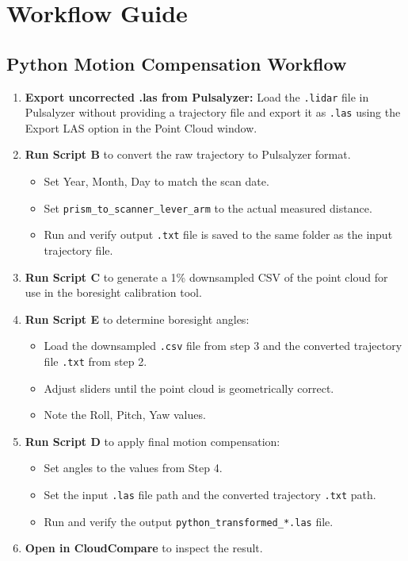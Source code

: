 \chapter{Workflow Guide}

\section{Python Motion Compensation Workflow}
\begin{enumerate}
    \item \textbf{Export uncorrected .las from Pulsalyzer:} Load the \texttt{.lidar} file in Pulsalyzer without providing a trajectory file and export it as \texttt{.las} using the Export LAS option in the Point Cloud window.
    \item \textbf{Run Script B} to convert the raw trajectory to Pulsalyzer format.
          \begin{itemize}
              \item Set Year, Month, Day to match the scan date.
              \item Set \texttt{prism\_to\_scanner\_lever\_arm} to the actual measured distance.
              \item Run and verify output \texttt{.txt} file is saved to the same folder as the input trajectory file.
          \end{itemize}
    \item \textbf{Run Script C} to generate a 1\% downsampled CSV of the point cloud for use in the boresight calibration tool.
    \item \textbf{Run Script E} to determine boresight angles:
          \begin{itemize}
              \item Load the downsampled \texttt{.csv} file from step 3 and the converted trajectory file \texttt{.txt} from step 2.
              \item Adjust sliders until the point cloud is geometrically correct.
              \item Note the Roll, Pitch, Yaw values.
          \end{itemize}
    \item \textbf{Run Script D} to apply final motion compensation:
          \begin{itemize}
              \item Set angles to the values from Step 4.
              \item Set the input \texttt{.las} file path and the converted trajectory \texttt{.txt} path.
              \item Run and verify the output \texttt{python\_transformed\_*.las} file.
          \end{itemize}
    \item \textbf{Open in CloudCompare} to inspect the result.
\end{enumerate}

